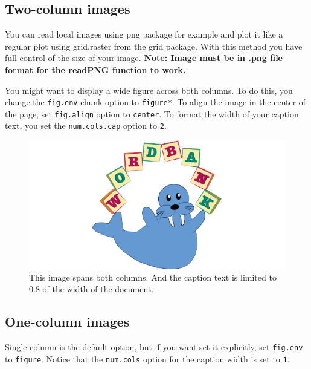 \documentclass[10pt, letterpaper]{article}
\newenvironment{CodeChunk}{}{}
\begin{document}
\hypertarget{two-column-images}{%
\subsection{Two-column images}\label{two-column-images}}

You can read local images using png package for example and plot it like
a regular plot using grid.raster from the grid package. With this method
you have full control of the size of your image. \textbf{Note: Image
must be in .png file format for the readPNG function to work.}

You might want to display a wide figure across both columns. To do this,
you change the \texttt{fig.env} chunk option to \texttt{figure*}. To
align the image in the center of the page, set \texttt{fig.align} option
to \texttt{center}. To format the width of your caption text, you set
the \texttt{num.cols.cap} option to \texttt{2}.

\begin{CodeChunk}
\begin{figure}[h]

{\centering \includegraphics{figs/2-col-image-1} 

}

\caption[This image spans both columns]{This image spans both columns. And the caption text is limited to 0.8 of the width of the document.}\label{fig:2-col-image}
\end{figure}
\end{CodeChunk}

\hypertarget{one-column-images}{%
\subsection{One-column images}\label{one-column-images}}

Single column is the default option, but if you want set it explicitly,
set \texttt{fig.env} to \texttt{figure}. Notice that the
\texttt{num.cols} option for the caption width is set to \texttt{1}.
\end{document}
